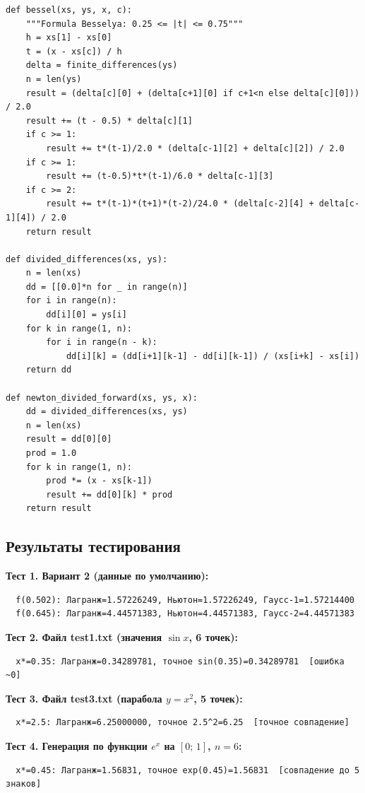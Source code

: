 \documentclass[a4paper,12pt]{article}
\begin{document}
\begin{lstlisting}[style=intellij, caption={Формула Бесселя и разделённые разности}]
def bessel(xs, ys, x, c):
    """Formula Besselya: 0.25 <= |t| <= 0.75"""
    h = xs[1] - xs[0]
    t = (x - xs[c]) / h
    delta = finite_differences(ys)
    n = len(ys)
    result = (delta[c][0] + (delta[c+1][0] if c+1<n else delta[c][0])) / 2.0
    result += (t - 0.5) * delta[c][1]
    if c >= 1:
        result += t*(t-1)/2.0 * (delta[c-1][2] + delta[c][2]) / 2.0
    if c >= 1:
        result += (t-0.5)*t*(t-1)/6.0 * delta[c-1][3]
    if c >= 2:
        result += t*(t-1)*(t+1)*(t-2)/24.0 * (delta[c-2][4] + delta[c-1][4]) / 2.0
    return result

def divided_differences(xs, ys):
    n = len(xs)
    dd = [[0.0]*n for _ in range(n)]
    for i in range(n):
        dd[i][0] = ys[i]
    for k in range(1, n):
        for i in range(n - k):
            dd[i][k] = (dd[i+1][k-1] - dd[i][k-1]) / (xs[i+k] - xs[i])
    return dd

def newton_divided_forward(xs, ys, x):
    dd = divided_differences(xs, ys)
    n = len(xs)
    result = dd[0][0]
    prod = 1.0
    for k in range(1, n):
        prod *= (x - xs[k-1])
        result += dd[0][k] * prod
    return result
\end{lstlisting}

\subsection{Результаты тестирования}

\textbf{Тест 1. Вариант 2 (данные по умолчанию):}
\begin{verbatim}
  f(0.502): Лагранж=1.57226249, Ньютон=1.57226249, Гаусс-1=1.57214400
  f(0.645): Лагранж=4.44571383, Ньютон=4.44571383, Гаусс-2=4.44571383
\end{verbatim}

\textbf{Тест 2. Файл test1.txt (значения $\sin x$, 6 точек):}
\begin{verbatim}
  x*=0.35: Лагранж=0.34289781, точное sin(0.35)=0.34289781  [ошибка ~0]
\end{verbatim}

\textbf{Тест 3. Файл test3.txt (парабола $y=x^2$, 5 точек):}
\begin{verbatim}
  x*=2.5: Лагранж=6.25000000, точное 2.5^2=6.25  [точное совпадение]
\end{verbatim}

\textbf{Тест 4. Генерация по функции $e^x$ на $[0;\,1]$, $n=6$:}
\begin{verbatim}
  x*=0.45: Лагранж=1.56831, точное exp(0.45)=1.56831  [совпадение до 5 знаков]
\end{verbatim}
\end{document}
